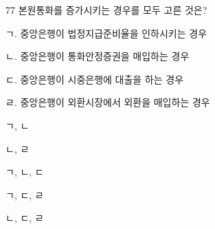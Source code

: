 \begin{question}{77}
본원통화를 증가시키는 경우를 모두 고른 것은?
\begin{framedtext}
ㄱ. 중앙은행이 법정지급준비율을 인하시키는 경우 \par
ㄴ. 중앙은행이 통화안정증권을 매입하는 경우 \par
ㄷ. 중앙은행이 시중은행에 대출을 하는 경우 \par
ㄹ. 중앙은행이 외환시장에서 외환을 매입하는 경우
\end{framedtext}
\begin{choices}
  \item ㄱ, ㄴ
  \item ㄴ, ㄹ
  \item ㄱ, ㄴ, ㄷ
  \item ㄱ, ㄷ, ㄹ
  \item ㄴ, ㄷ, ㄹ
\end{choices}
\end{question}
